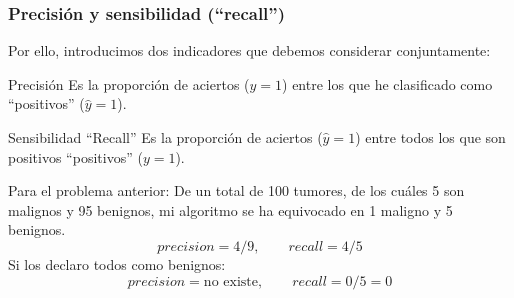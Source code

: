 \documentclass{beamer}
\begin{document}
\begin{frame}
  \frametitle{Precisión y sensibilidad (``recall'')}
  Por ello, introducimos dos indicadores que debemos considerar conjuntamente:
 
  \footnotesize
  \begin{block}{Precisión}
  Es la proporción  de  aciertos ($y=1$) entre los que he clasificado como
  ``positivos'' ($\hat y=1$). 
\end{block}
  \begin{block}{Sensibilidad ``Recall''}
  Es la proporción de aciertos ($\hat y=1$) entre todos los que son positivos
  ``positivos'' ($y=1$). 
\end{block}
Para el problema anterior: De un total de 100 tumores, de los cuáles 5 son malignos y 95
  benignos, mi algoritmo se ha equivocado en 1 maligno y 5 benignos.
  $$precision = 4 / 9, \qquad recall = 4 / 5$$
  Si los declaro todos como benignos:
  $$precision = \mbox{no existe}, \qquad recall = 0 / 5= 0$$
  
\end{frame}
\end{document}
